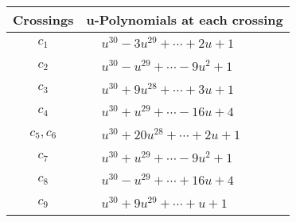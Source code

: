 \documentclass[1p]{elsarticle_modified}
\theoremstyle{definition}
\begin{document}
\begin{tabular}{m{50pt}|m{274pt}}
Crossings & \hspace{64pt}u-Polynomials at each crossing \\
\hline $$\begin{aligned}c_{1}\end{aligned}$$&$\begin{aligned}
&u^{30}-3 u^{29}+\cdots+2 u+1
\end{aligned}$\\
\hline $$\begin{aligned}c_{2}\end{aligned}$$&$\begin{aligned}
&u^{30}- u^{29}+\cdots-9 u^2+1
\end{aligned}$\\
\hline $$\begin{aligned}c_{3}\end{aligned}$$&$\begin{aligned}
&u^{30}+9 u^{28}+\cdots+3 u+1
\end{aligned}$\\
\hline $$\begin{aligned}c_{4}\end{aligned}$$&$\begin{aligned}
&u^{30}+u^{29}+\cdots-16 u+4
\end{aligned}$\\
\hline $$\begin{aligned}c_{5},c_{6}\end{aligned}$$&$\begin{aligned}
&u^{30}+20 u^{28}+\cdots+2 u+1
\end{aligned}$\\
\hline $$\begin{aligned}c_{7}\end{aligned}$$&$\begin{aligned}
&u^{30}+u^{29}+\cdots-9 u^2+1
\end{aligned}$\\
\hline $$\begin{aligned}c_{8}\end{aligned}$$&$\begin{aligned}
&u^{30}- u^{29}+\cdots+16 u+4
\end{aligned}$\\
\hline $$\begin{aligned}c_{9}\end{aligned}$$&$\begin{aligned}
&u^{30}+9 u^{29}+\cdots+u+1
\end{aligned}$\\

\end{tabular}
\end{document}
